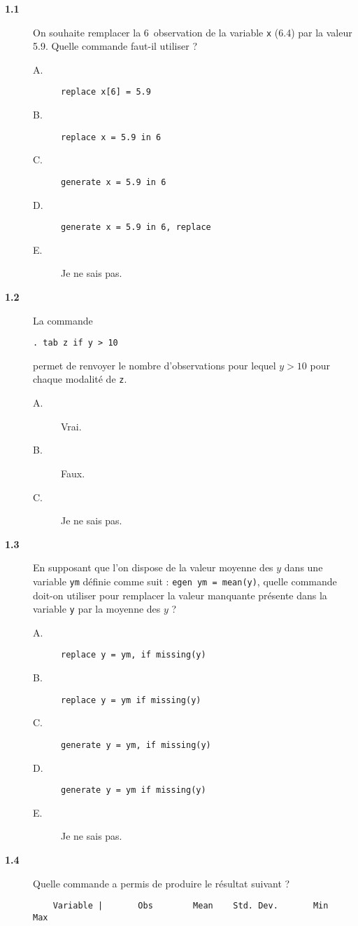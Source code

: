 \begin{description}
\item[\bf 1.1] On souhaite remplacer la 6\ieme\ observation de la variable
  \texttt{x} (6.4) par la valeur 5.9. Quelle commande faut-il utiliser ?
  \begin{description}
  \item[A.] \verb|replace x[6] = 5.9|
  \item[B.] \verb|replace x = 5.9 in 6|
  \item[C.] \verb|generate x = 5.9 in 6|
  \item[D.] \verb|generate x = 5.9 in 6, replace|
  \item[E.] Je ne sais pas.
  \end{description}  
\item[\bf 1.2] La commande
\begin{verbatim}
. tab z if y > 10
\end{verbatim}
permet de renvoyer le nombre d'observations pour lequel $y > 10$ pour chaque
modalité de \texttt{z}. 
  \begin{description}
  \item[A.] Vrai.
  \item[B.] Faux.
  \item[C.] Je ne sais pas.
  \end{description}  
\item[\bf 1.3] En supposant que l'on dispose de la valeur moyenne des $y$
  dans une variable \texttt{ym} définie comme suit :
  \verb|egen ym = mean(y)|, quelle commande doit-on utiliser pour remplacer
  la valeur manquante présente dans la variable \texttt{y} par la moyenne
  des $y$ ?  
  \begin{description}
  \item[A.] \verb|replace y = ym, if missing(y)|
  \item[B.] \verb|replace y = ym if missing(y)|
  \item[C.] \verb|generate y = ym, if missing(y)|
  \item[D.] \verb|generate y = ym if missing(y)|
  \item[E.] Je ne sais pas.
  \end{description}  
\item[\bf 1.4] Quelle commande a permis de produire le résultat suivant ?
\begin{verbatim}
    Variable |       Obs        Mean    Std. Dev.       Min        Max

\end{verbatim}
\end{description}
